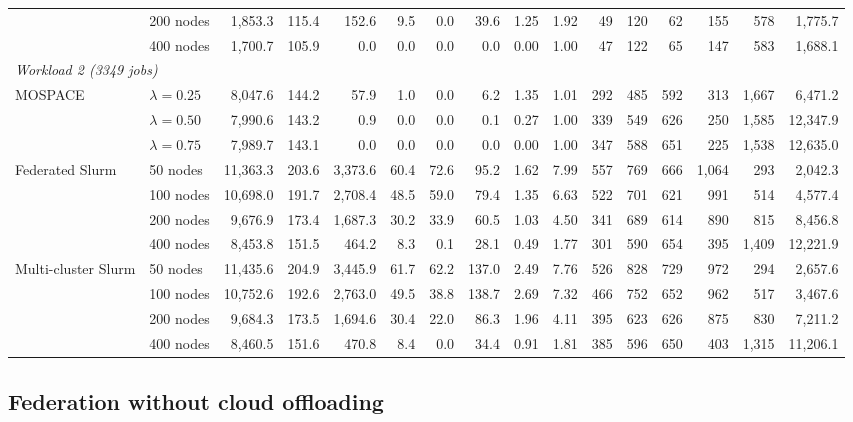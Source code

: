 \documentclass[conference]{IEEEtran}
\begin{document}
\begin{table}[t]
{\begin{tabular}{llrrrrrrrrrrrrrr}
 & 200 nodes & 1{,}853.3 & 115.4 & 152.6 & 9.5 & 0.0 & 39.6 & 1.25 & 1.92 & 49 & 120 & 62 & 155 & 578 & 1{,}775.7 \\
 & 400 nodes & 1{,}700.7 & 105.9 & 0.0 & 0.0 & 0.0 & 0.0 & 0.00 & 1.00 & 47 & 122 & 65 & 147 & 583 & 1{,}688.1 \\
\midrule
\multicolumn{16}{l}{\textit{Workload 2 (3349 jobs)}} \\
MOSPACE & $\lambda=0.25$ & 8{,}047.6 & 144.2 & 57.9 & 1.0 & 0.0 & 6.2 & 1.35 & 1.01 & 292 & 485 & 592 & 313 & 1{,}667 & 6{,}471.2 \\
 & $\lambda=0.50$ & 7{,}990.6 & 143.2 & 0.9 & 0.0 & 0.0 & 0.1 & 0.27 & 1.00 & 339 & 549 & 626 & 250 & 1{,}585 & 12{,}347.9 \\
 & $\lambda=0.75$ & 7{,}989.7 & 143.1 & 0.0 & 0.0 & 0.0 & 0.0 & 0.00 & 1.00 & 347 & 588 & 651 & 225 & 1{,}538 & 12{,}635.0 \\
\cmidrule(lr){2-16}
Federated Slurm & 50 nodes & 11{,}363.3 & 203.6 & 3{,}373.6 & 60.4 & 72.6 & 95.2 & 1.62 & 7.99 & 557 & 769 & 666 & 1{,}064 & 293 & 2{,}042.3 \\
 & 100 nodes & 10{,}698.0 & 191.7 & 2{,}708.4 & 48.5 & 59.0 & 79.4 & 1.35 & 6.63 & 522 & 701 & 621 & 991 & 514 & 4{,}577.4 \\
 & 200 nodes & 9{,}676.9 & 173.4 & 1{,}687.3 & 30.2 & 33.9 & 60.5 & 1.03 & 4.50 & 341 & 689 & 614 & 890 & 815 & 8{,}456.8 \\
 & 400 nodes & 8{,}453.8 & 151.5 & 464.2 & 8.3 & 0.1 & 28.1 & 0.49 & 1.77 & 301 & 590 & 654 & 395 & 1{,}409 & 12{,}221.9 \\
\cmidrule(lr){2-16}
Multi-cluster Slurm & 50 nodes & 11{,}435.6 & 204.9 & 3{,}445.9 & 61.7 & 62.2 & 137.0 & 2.49 & 7.76 & 526 & 828 & 729 & 972 & 294 & 2{,}657.6 \\
 & 100 nodes & 10{,}752.6 & 192.6 & 2{,}763.0 & 49.5 & 38.8 & 138.7 & 2.69 & 7.32 & 466 & 752 & 652 & 962 & 517 & 3{,}467.6 \\
 & 200 nodes & 9{,}684.3 & 173.5 & 1{,}694.6 & 30.4 & 22.0 & 86.3 & 1.96 & 4.11 & 395 & 623 & 626 & 875 & 830 & 7{,}211.2 \\
 & 400 nodes & 8{,}460.5 & 151.6 & 470.8 & 8.4 & 0.0 & 34.4 & 0.91 & 1.81 & 385 & 596 & 650 & 403 & 1{,}315 & 11{,}206.1 \\
\bottomrule
\end{tabular}%
}
\end{table}


\subsection{Federation without cloud offloading}
\end{document}

